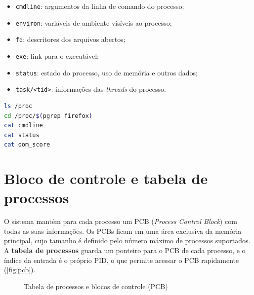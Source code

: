 \begin{itemize}
  \item \texttt{cmdline}: argumentos da linha de comando do processo;
  \item \texttt{environ}: variáveis de ambiente visíveis ao processo;
  \item \texttt{fd}: descritores dos arquivos abertos;
  \item \texttt{exe}: link para o executável;
  \item \texttt{status}: estado do processo, uso de memória e outros dados;
  \item \texttt{task/<tid>}: informações das \textit{threads} do processo.
\end{itemize}

\begin{lstlisting}[language=bash, caption={Consultando um processo pelo \texorpdfstring{\texttt{/proc}}{/proc}}, label={cod:proc}]
ls /proc
cd /proc/$(pgrep firefox)
cat cmdline
cat status
cat oom_score
\end{lstlisting}

\section{Bloco de controle e tabela de processos}

O sistema mantém para cada processo um PCB (\textit{Process Control Block}) com todas as suas informações. Os PCBs ficam em uma área exclusiva da memória principal, cujo tamanho é definido pelo número máximo de processos suportados. A \textbf{tabela de processos} guarda um ponteiro para o PCB de cada processo, e o índice da entrada é o próprio PID, o que permite acessar o PCB rapidamente (\autoref{fig:pcb}).

\begin{figure}[H]
  \centering
  \caption{Tabela de processos e blocos de controle (PCB)}\label{fig:pcb}
\end{figure}

